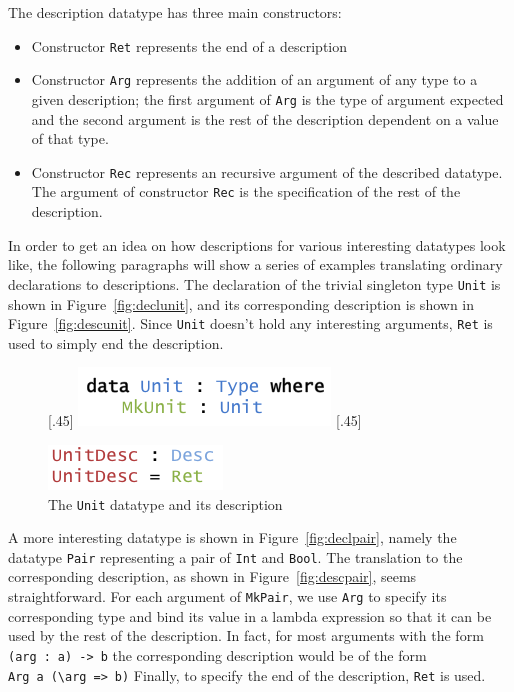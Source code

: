 \documentclass{ituthesis}
\newcommand{\ttconstructor}[1]{\textcolor{constructor-color}{\texttt{#1}}}
\newcommand{\tttype}[1]{\textcolor{type-color}{\texttt{#1}}}
\newcommand{\ttvar}[1]{\textcolor{local-var-color}{\texttt{#1}}}
\theoremstyle{definition}
\begin{document}
The description datatype has three main constructors:
\begin{itemize}
  \item  Constructor \ttconstructor{Ret} represents the end of a description
  \item  Constructor \ttconstructor{Arg} represents the addition of an argument of any type to a given description; the first argument of \ttconstructor{Arg} is the type of argument expected and the second argument is the rest of the description dependent on a value of that type.
  \item  Constructor \ttconstructor{Rec} represents an recursive argument of the described datatype. The argument of constructor \ttconstructor{Rec} is the specification of the rest of the description.
\end{itemize}

In order to get an idea on how descriptions for various interesting datatypes look like, the following paragraphs will show a series of examples translating ordinary declarations to descriptions.
The declaration of the trivial singleton type \tttype{Unit} is shown in Figure~\ref{fig:declunit}, and its corresponding description is shown in Figure~\ref{fig:descunit}. Since \tttype{Unit} doesn't hold
any interesting arguments, \ttconstructor{Ret} is used to simply end the description.

\begin{figure}[ht]
\begin{center}
  \subcaptionbox{Declaration of \tttype{Unit}\label{fig:declunit}}[.45\textwidth]{
    \includegraphics[scale=0.5]{Figures/UnitDeclaration.png}
}
\subcaptionbox{Description of \tttype{Unit}\label{fig:descunit}}[.45\textwidth]{
    \includegraphics[scale=0.5]{Figures/UnitDescription.png}

}
\caption{The \tttype{Unit} datatype and its description}
\end{center}
\end{figure}

A more interesting datatype is shown in Figure~\ref{fig:declpair}, namely the datatype \tttype{Pair} representing a pair of \tttype{Int} and \tttype{Bool}.
The translation to the corresponding description, as shown in Figure~\ref{fig:descpair}, seems straightforward. For each argument of \ttconstructor{MkPair}, we use
\ttconstructor{Arg} to specify its corresponding type and bind its value in a lambda expression so that it can be used by the rest of the description. In fact, for most arguments with the form \texttt{(}\ttvar{arg}~\texttt{:}~\ttvar{a}\texttt{)~->}~\ttvar{b} the corresponding description
would be of the form \ttconstructor{Arg}~\ttvar{a}~\texttt{(\textbackslash}\ttvar{arg}~\texttt{=>}~\ttvar{b}\texttt{)}
Finally, to specify the end of the description, \ttconstructor{Ret} is used.
\end{document}
